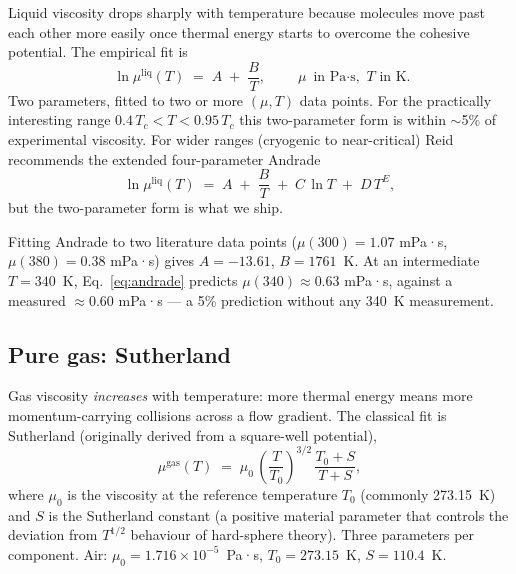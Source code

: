 \documentclass[11pt,a4paper]{article}
\begin{document}
Liquid viscosity drops sharply with temperature because molecules
move past each other more easily once thermal energy starts to
overcome the cohesive potential.  The empirical fit is
\begin{equation}
   \boxed{\;
   \ln \mu^{\mathrm{liq}}(T) \;=\; A \;+\; \frac{B}{T},
   \;}\qquad \mu \text{ in Pa$\cdot$s, } T \text{ in K.}
   \label{eq:andrade}
\end{equation}
Two parameters, fitted to two or more $(\mu, T)$ data points.  For
the practically interesting range $0.4\,T_c < T < 0.95\,T_c$ this
two-parameter form is within $\sim$5\% of experimental viscosity.
For wider ranges (cryogenic to near-critical) Reid recommends the
extended four-parameter Andrade
\begin{equation}
   \ln \mu^{\mathrm{liq}}(T) \;=\;
     A \;+\; \frac{B}{T} \;+\; C\,\ln T \;+\; D\,T^E,
\end{equation}
but the two-parameter form is what we ship.

\begin{example}
Fitting Andrade to two literature data points ($\mu(300) = 1.07$ mPa·s,
$\mu(380) = 0.38$ mPa·s) gives $A = -13.61$, $B = 1761$~K.  At an
intermediate $T = 340$~K, Eq.~\eqref{eq:andrade} predicts $\mu(340)
\approx 0.63$ mPa·s, against a measured $\approx 0.60$ mPa·s --- a
5\% prediction without any 340~K measurement.
\end{example}

\subsection{Pure gas: Sutherland}

Gas viscosity \emph{increases} with temperature: more thermal energy
means more momentum-carrying collisions across a flow gradient.  The
classical fit is Sutherland (originally derived from a square-well
potential),
\begin{equation}
   \boxed{\;
   \mu^{\mathrm{gas}}(T) \;=\; \mu_0\,
     \left(\frac{T}{T_0}\right)^{3/2}\,
     \frac{T_0 + S}{T + S},
   \;}
   \label{eq:sutherland}
\end{equation}
where $\mu_0$ is the viscosity at the reference temperature $T_0$
(commonly 273.15~K) and $S$ is the Sutherland constant (a positive
material parameter that controls the deviation from $T^{1/2}$
behaviour of hard-sphere theory).  Three parameters per component.
Air: $\mu_0 = 1.716 \times 10^{-5}$~Pa·s, $T_0 = 273.15$~K,
$S = 110.4$~K.
\end{document}
